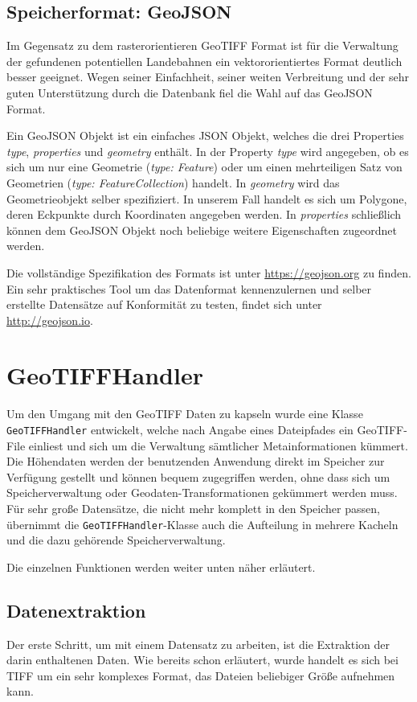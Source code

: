 \documentclass[10pt,a4paper]{report}
\begin{document}
\subsection{Speicherformat: GeoJSON}
Im Gegensatz zu dem rasterorientieren GeoTIFF Format ist für die Verwaltung der gefundenen potentiellen Landebahnen ein vektororientiertes Format deutlich besser geeignet. Wegen seiner Einfachheit, seiner weiten Verbreitung und der sehr guten Unterstützung durch die Datenbank fiel die Wahl auf das GeoJSON Format.

Ein GeoJSON Objekt ist ein einfaches JSON Objekt, welches die drei Properties \emph{type}, \emph{properties} und \emph{geometry} enthält. In der Property \emph{type} wird angegeben, ob es sich um nur eine Geometrie (\emph{type: Feature}) oder um einen mehrteiligen Satz von Geometrien (\emph{type: FeatureCollection}) handelt. In \emph{geometry} wird das Geometrieobjekt selber spezifiziert. In unserem Fall handelt es sich um Polygone, deren Eckpunkte durch Koordinaten angegeben werden. In \emph{properties} schließlich können dem GeoJSON Objekt noch beliebige weitere Eigenschaften zugeordnet werden.

Die vollständige Spezifikation des Formats ist unter \url{https://geojson.org} zu finden. Ein sehr praktisches Tool um das Datenformat kennenzulernen und selber erstellte Datensätze auf Konformität zu testen, findet sich unter \url{http://geojson.io}.

\section{GeoTIFFHandler}

Um den Umgang mit den GeoTIFF Daten zu kapseln wurde eine Klasse \texttt{GeoTIFFHandler} entwickelt, welche nach Angabe eines Dateipfades ein GeoTIFF-File einliest und sich um die Verwaltung sämtlicher Metainformationen kümmert. Die Höhendaten werden der benutzenden Anwendung direkt im Speicher zur Verfügung gestellt und können bequem zugegriffen werden, ohne dass sich um Speicherverwaltung oder Geodaten-Transformationen gekümmert werden muss. Für sehr große Datensätze, die nicht mehr komplett in den Speicher passen, übernimmt die \texttt{GeoTIFFHandler}-Klasse auch die Aufteilung in mehrere Kacheln und die dazu gehörende Speicherverwaltung.

Die einzelnen Funktionen werden weiter unten näher erläutert.

\subsection{Datenextraktion}
Der erste Schritt, um mit einem Datensatz zu arbeiten, ist die Extraktion der darin enthaltenen Daten. Wie bereits schon erläutert, wurde handelt es sich bei TIFF um ein sehr komplexes Format, das Dateien beliebiger Größe aufnehmen kann.
\end{document}
